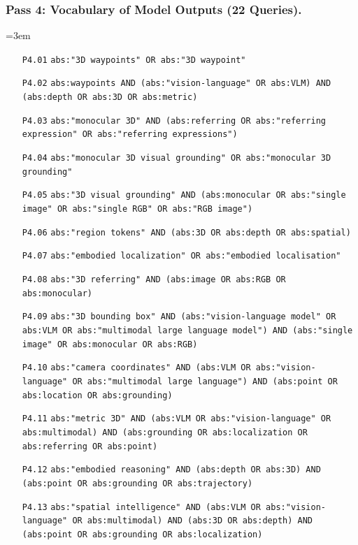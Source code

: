 \subsubsection{Pass 4: Vocabulary of Model Outputs (22 Queries).}
{\footnotesize\raggedright\emergencystretch=3em\begin{itemize}\setlength{\itemsep}{0pt}\setlength{\parskip}{0pt}
\item[\texttt{P4.01}] \texttt{abs:"3D waypoints" OR abs:"3D waypoint"}
\item[\texttt{P4.02}] \texttt{abs:waypoints AND (abs:"vision-language" OR abs:VLM) AND (abs:depth OR abs:3D OR abs:metric)}
\item[\texttt{P4.03}] \texttt{abs:"monocular 3D" AND (abs:referring OR abs:"referring expression" OR abs:"referring expressions")}
\item[\texttt{P4.04}] \texttt{abs:"monocular 3D visual grounding" OR abs:"monocular 3D grounding"}
\item[\texttt{P4.05}] \texttt{abs:"3D visual grounding" AND (abs:monocular OR abs:"single image" OR abs:"single RGB" OR abs:"RGB image")}
\item[\texttt{P4.06}] \texttt{abs:"region tokens" AND (abs:3D OR abs:depth OR abs:spatial)}
\item[\texttt{P4.07}] \texttt{abs:"embodied localization" OR abs:"embodied localisation"}
\item[\texttt{P4.08}] \texttt{abs:"3D referring" AND (abs:image OR abs:RGB OR abs:monocular)}
\item[\texttt{P4.09}] \texttt{abs:"3D bounding box" AND (abs:"vision-language model" OR abs:VLM OR abs:"multimodal large language model") AND (abs:"single image" OR abs:monocular OR abs:RGB)}
\item[\texttt{P4.10}] \texttt{abs:"camera coordinates" AND (abs:VLM OR abs:"vision-language" OR abs:"multimodal large language") AND (abs:point OR abs:location OR abs:grounding)}
\item[\texttt{P4.11}] \texttt{abs:"metric 3D" AND (abs:VLM OR abs:"vision-language" OR abs:multimodal) AND (abs:grounding OR abs:localization OR abs:referring OR abs:point)}
\item[\texttt{P4.12}] \texttt{abs:"embodied reasoning" AND (abs:depth OR abs:3D) AND (abs:point OR abs:grounding OR abs:trajectory)}
\item[\texttt{P4.13}] \texttt{abs:"spatial intelligence" AND (abs:VLM OR abs:"vision-language" OR abs:multimodal) AND (abs:3D OR abs:depth) AND (abs:point OR abs:grounding OR abs:localization)}

\end{itemize}}
